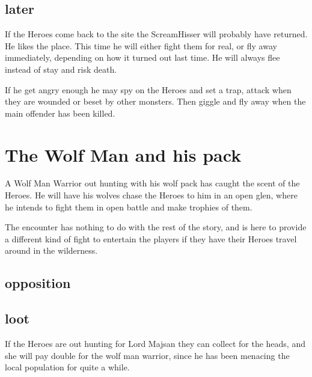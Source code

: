 \subsection*{later}
If the Heroes come back to the site the ScreamHisser will probably have returned. He likes the place. This time he will either fight them for real, or fly away immediately, depending on how it turned out last time. He will always flee instead of stay and risk death.

If he get angry enough he may spy on the Heroes and set a trap, attack when they are wounded or beset by other monsters. Then giggle and fly away when the main offender has been killed.









\section*{The Wolf Man and his pack}
A Wolf Man Warrior out hunting with his wolf pack has caught the scent of the Heroes. He will have his wolves chase the Heroes to him in an open glen, where he intends to fight them in open battle and make trophies of them.

The encounter has nothing to do with the rest of the story, and is here to provide a different kind of fight to entertain the players if they have their Heroes travel around in the wilderness.


\subsection*{opposition}



\subsection*{loot}
If the Heroes are out hunting for Lord Majsan they can collect for the heads, and she will pay double for the wolf man warrior, since he has been menacing the local population for quite a while.





